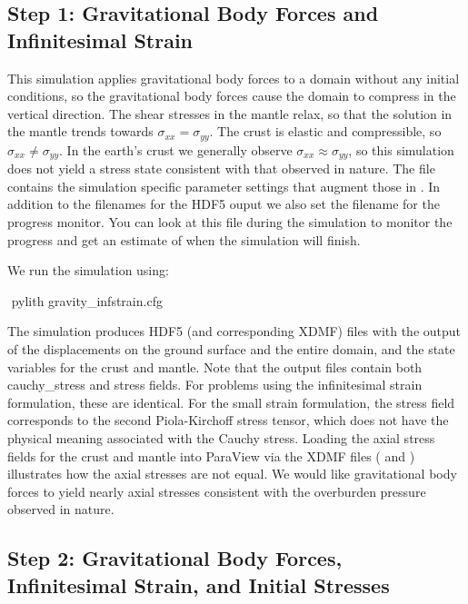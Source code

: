 \subsection{Step 1: Gravitational Body Forces and Infinitesimal Strain}

This simulation applies gravitational body forces to a domain without
any initial conditions, so the gravitational body forces cause the
domain to compress in the vertical direction. The shear stresses in
the mantle relax, so that the solution in the mantle trends towards
$\sigma_{xx}=\sigma_{yy}$. The crust is elastic and compressible, so
$\sigma_{xx}\neq\sigma_{\mathit{yy}}$. In the earth's crust we
generally observe $\sigma_{\mathit{xx}}\approx\sigma_{\mathit{yy}}$,
so this simulation does not yield a stress state consistent with that
observed in nature. The file 
contains the simulation specific parameter settings that augment those
in .  In addition to the filenames for the
HDF5 ouput we also set the filename for the progress monitor. You can
look at this file during the simulation to monitor the progress and
get an estimate of when the simulation will finish.

We run the simulation using:
\begin{shell}
$$ pylith gravity_infstrain.cfg
\end{shell}
The simulation produces HDF5 (and corresponding XDMF) files with the
output of the displacements on the ground surface and the entire
domain, and the state variables for the crust and mantle. Note that
the output files contain both cauchy\_stress and stress fields. For
problems using the infinitesimal strain formulation, these are
identical. For the small strain formulation, the stress field
corresponds to the second Piola-Kirchoff stress tensor, which does not
have the physical meaning associated with the Cauchy stress. Loading
the axial stress fields for the crust and mantle into ParaView via the
XDMF files ( and
) illustrates how the
axial stresses are not equal. We would like gravitational body forces
to yield nearly axial stresses consistent with the overburden pressure
observed in nature.


\subsection{Step 2: Gravitational Body Forces, Infinitesimal Strain, and Initial Stresses}


